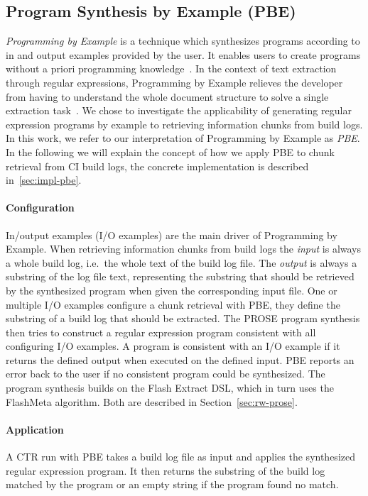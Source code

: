 \documentclass[\myrootdir/main.tex]{subfiles}
\begin{document}
\subsection{Program Synthesis by Example (PBE)}
\label{sec:expl-pbe}
\emph{Programming by Example} is a technique which synthesizes programs according to in and output examples provided by the user.
It enables users to create programs without a priori programming knowledge~\cite{mayer2015user}.
In the context of text extraction through regular expressions, Programming by Example relieves the developer from having to understand the whole document structure to solve a single extraction task~\cite{le2014flashextract:}.
We chose to investigate the applicability of generating regular expression programs by example to retrieving information chunks from build logs.
In this work, we refer to our interpretation of Programming by Example as \emph{PBE}.
In the following we will explain the concept of how we apply PBE to chunk retrieval from CI build logs, the concrete implementation is described in~\ref{sec:impl-pbe}.

\paragraph{Configuration}
In/output examples (I/O examples) are the main driver of Programming by Example.
When retrieving information chunks from build logs the \emph{input} is always a whole build log, i.e.\ the whole text of the build log file.
The \emph{output} is always a substring of the log file text, representing the substring that should be retrieved by the synthesized program when given the corresponding input file.
One or multiple I/O examples configure a chunk retrieval with PBE, they define the substring of a build log that should be extracted.
The PROSE program synthesis then tries to construct a regular expression program consistent with all configuring I/O examples.
A program is consistent with an I/O example if it returns the defined output when executed on the defined input.
PBE reports an error back to the user if no consistent program could be synthesized.
The program synthesis builds on the Flash Extract DSL, which in turn uses the FlashMeta algorithm.
Both are described in Section~\ref{sec:rw-prose}.

\paragraph{Application}
A CTR run with PBE takes a build log file as input and applies the synthesized regular expression program.
It then returns the substring of the build log matched by the program or an empty string if the program found no match.
\end{document}
